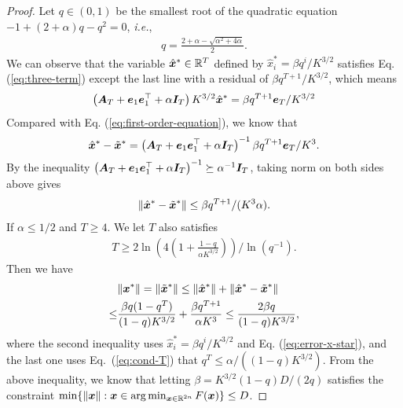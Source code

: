\begin{proof}
Let $q \in (0,1)$ be the smallest root of the quadratic equation $-1+(2+\alpha) q -q^2 = 0$, \textit{i.e.},
\begin{align*}
    q = \frac{2 + \alpha - \sqrt{\alpha^2 + 4\alpha }}{2}.
\end{align*}
We can observe that the variable $\hat {{\bm{x}}}^* \in {\mathbb{R}}^{T}$ defined by 
$\hat x_i^* = \beta q^i / K^{3/2}$ satisfies Eq. (\ref{eq:three-term}) except the last line with a residual of $\beta q^{T+1} / K^{3/2} $, which means 
\begin{align*}
    \left( {\bm{A}}_T + {\bm{e}}_1 {\bm{e}}_1^\top + \alpha {\bm{I}}_{T} \right) K^{3/2} \hat {{\bm{x}}}^* = \beta q^{T+1} {\bm{e}}_{T} / K^{3/2} 
\end{align*}
Compared with Eq. (\ref{eq:first-order-equation}), we know that
\begin{align*}
    \hat {{\bm{x}}}^* - \tilde {{\bm{x}}}^* = \left( {\bm{A}}_T + {\bm{e}}_1 {\bm{e}}_1^\top + \alpha {\bm{I}}_{T} \right)^{-1} \beta q^{T+1} {\bm{e}}_{T} / K^{3}.
\end{align*}
By the inequality $\left( {\bm{A}}_T + {\bm{e}}_1 {\bm{e}}_1^\top + \alpha {\bm{I}}_{T} \right)^{-1} \succeq \alpha^{-1}{\bm{I}}_T  $, taking norm on both sides above gives
\begin{align} \label{eq:error-x-star}
    \Vert \hat {{\bm{x}}}^* - \tilde {{\bm{x}}}^* \Vert \le \beta q^{T+1} / (K^{3} \alpha).
\end{align}
If $\alpha \le 1/2$ and $T \ge 4$. We let $T$ also satisfies  
\begin{align} \label{eq:cond-T}
    T \ge  2  \ln \left( 4 \left( 1 + \frac{1-q}{\alpha K^{3/2}} \right) \right)     \Big / \ln (q^{-1}).
\end{align}
Then we have
\begin{align*}
    &\Vert {\bm{x}}^* \Vert = \Vert \tilde {{\bm{x}}}^* \Vert \le \Vert \hat {{\bm{x}}}^* \Vert + \Vert \hat {{\bm{x}}}^* - \tilde {{\bm{x}}}^* \Vert \\
    \le& \frac{\beta q (1-q^T)}{(1-q) K^{3/2} } + \frac{\beta q^{T+1}}{\alpha K^{3}} \le \frac{2 \beta q}{(1-q) K^{3/2}},
\end{align*}
where the second inequality uses $\hat x_i^* = \beta q^i / K^{3/2}$ and Eq. (\ref{eq:error-x-star}), and the last one uses Eq.~(\ref{eq:cond-T}) that $q^T \le \alpha/ ((1-q) K^{3/2})$. From the above inequality, we know that
letting $ \beta = K^{3/2} (1-q) D / (2q) $ satisfies the constraint 
$\min\{ \Vert {\bm{x}} \Vert : {\bm{x}} \in  \arg \min_{{\bm{x}} \in {\mathbb{R}}^{2n}} F({\bm{x}})  \} \le D$.

\end{proof}

